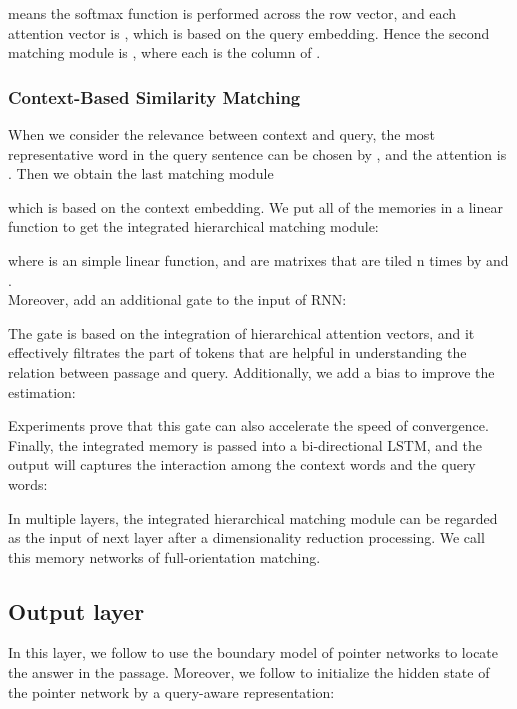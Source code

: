\documentclass[letterpaper]{article}
\begin{document}
 means the softmax function is performed across the row vector, and each attention vector is , which is based on the query embedding. Hence the second matching module is , where each  is the column of .\\

\subsubsection{Context-Based Similarity Matching}
When we consider the relevance between context and query, the most representative word in the query sentence can be chosen by , and the attention is . Then we obtain the last matching module


which is based on the context embedding. We put all of the memories in a linear function to get the integrated hierarchical matching module:


where  is an simple linear function,  and  are matrixes that are tiled n times by  and . \\

Moreover, \cite{rnet} add an additional gate to the input of RNN:



The gate is based on the integration of hierarchical attention vectors, and it effectively filtrates the part of tokens that are helpful in understanding the relation between passage and query. Additionally, we add a bias to improve the estimation:


Experiments prove that this gate can also accelerate the speed of convergence. Finally, the integrated memory  is passed into a bi-directional LSTM, and the output will captures the interaction among the context words and the query words:


In multiple layers, the integrated hierarchical matching module  can be regarded as the input  of next layer after a dimensionality reduction processing. We call this memory networks of full-orientation matching.


\subsection{Output layer}
In this layer, we follow \citet{wang2016machine} to use the boundary model of pointer networks \citep{vinyals2015pointer} to locate the answer in the passage. Moreover, we follow \cite{rnet} to initialize the hidden state of the pointer network by a query-aware representation:
\end{document}
